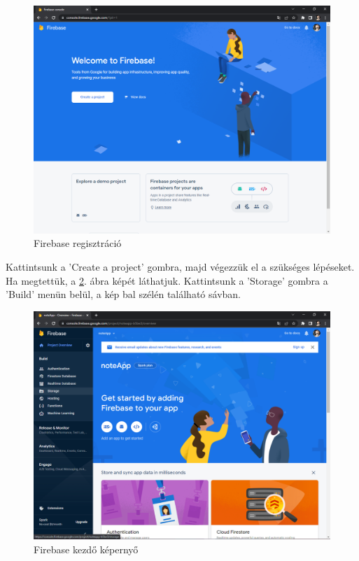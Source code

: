 \begin{figure}[H]
	\centering
	\includegraphics[scale=0.3]{images/config_2.png}
	\caption{Firebase regisztráció}
	\label{fig:firebase_reg}
\end{figure}
\noindent Kattintsunk a 'Create a project' gombra, majd végezzük el a szükséges lépéseket.
\\Ha megtettük, a \ref{fig:firebase_storage_reg}. ábra képét láthatjuk. Kattintsunk a 'Storage' gombra a 'Build' menün belül, a kép bal szélén található sávban.

\begin{figure}[H]
	\centering
	\includegraphics[scale=0.3]{images/config_3.png}
	\caption{Firebase kezdő képernyő}
	\label{fig:firebase_storage_reg}
\end{figure}

